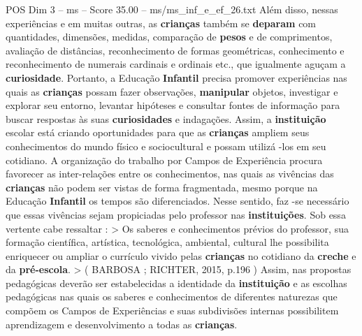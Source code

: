 \begin{textsample}{POS Dim 3 – ms – Score 35.00 – ms/ms\_inf\_e\_ef\_26.txt}
Além disso, nessas experiências e em muitas outras, as \textbf{crianças} também se \textbf{deparam} com quantidades, dimensões, medidas, comparação de \textbf{pesos} e de comprimentos, avaliação de distâncias, reconhecimento de formas geométricas, conhecimento e reconhecimento de numerais cardinais e ordinais etc., que igualmente aguçam a \textbf{curiosidade}.
Portanto, a Educação \textbf{Infantil} precisa promover experiências nas quais as \textbf{crianças} possam fazer observações, \textbf{manipular} objetos, investigar e explorar seu entorno, levantar hipóteses e consultar fontes de informação para buscar respostas às suas \textbf{curiosidades} e indagações.
Assim, a \textbf{instituição} escolar está criando oportunidades para que as \textbf{crianças} ampliem seus conhecimentos do mundo físico e sociocultural e possam utilizá -los em seu cotidiano.
A organização do trabalho por Campos de Experiência procura favorecer as inter-relações entre os conhecimentos, nas quais as vivências das \textbf{crianças} não podem ser vistas de forma fragmentada, mesmo porque na Educação \textbf{Infantil} os tempos são diferenciados.
Nesse sentido, faz -se necessário que essas vivências sejam propiciadas pelo professor nas \textbf{instituições}.
Sob essa vertente cabe ressaltar : > Os saberes e conhecimentos prévios do professor, sua formação científica, artística, tecnológica, ambiental, cultural lhe possibilita enriquecer ou ampliar o currículo vivido pelas \textbf{crianças} no cotidiano da \textbf{creche} e da \textbf{pré-escola}. > ( BARBOSA ; RICHTER, 2015, p.196 ) Assim, nas propostas pedagógicas deverão ser estabelecidas a identidade da \textbf{instituição} e as escolhas pedagógicas nas quais os saberes e conhecimentos de diferentes naturezas que compõem os Campos de Experiências e suas subdivisões internas possibilitem aprendizagem e desenvolvimento a todas as \textbf{crianças}.

\end{textsample}
